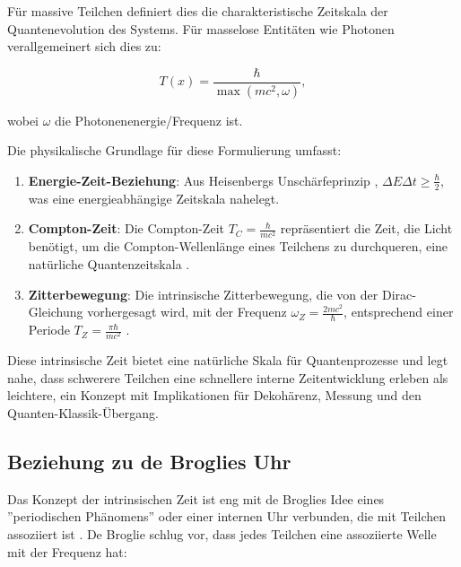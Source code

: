 \documentclass[12pt,a4paper]{article}
\newcommand{\Tfield}{T(x)}
\begin{document}
	Für massive Teilchen definiert dies die charakteristische Zeitskala der Quantenevolution des Systems. Für masselose Entitäten wie Photonen verallgemeinert sich dies zu:
	
	\begin{equation}
		\Tfield = \frac{\hbar}{\max(mc^2, \omega)},
		\label{eq:intrinsic_time_general}
	\end{equation}
	
	wobei $\omega$ die Photonenenergie/Frequenz ist.
	
	Die physikalische Grundlage für diese Formulierung umfasst:
	
	\begin{enumerate}
		\item \textbf{Energie-Zeit-Beziehung}: Aus Heisenbergs Unschärfeprinzip \cite{Heisenberg1927, Mandelstam1945}, $\Delta E \Delta t \geq \frac{\hbar}{2}$, was eine energieabhängige Zeitskala nahelegt.
		
		\item \textbf{Compton-Zeit}: Die Compton-Zeit $T_C = \frac{\hbar}{mc^2}$ repräsentiert die Zeit, die Licht benötigt, um die Compton-Wellenlänge eines Teilchens zu durchqueren, eine natürliche Quantenzeitskala \cite{MacGibbon1987, Caldirola1953}.
		
		\item \textbf{Zitterbewegung}: Die intrinsische Zitterbewegung, die von der Dirac-Gleichung vorhergesagt wird, mit der Frequenz $\omega_Z = \frac{2mc^2}{\hbar}$, entsprechend einer Periode $T_Z = \frac{\pi\hbar}{mc^2}$ \cite{Dirac1928, Schrodinger1930, Hestenes1990}.
	\end{enumerate}
	
	Diese intrinsische Zeit bietet eine natürliche Skala für Quantenprozesse und legt nahe, dass schwerere Teilchen eine schnellere interne Zeitentwicklung erleben als leichtere, ein Konzept mit Implikationen für Dekohärenz, Messung und den Quanten-Klassik-Übergang.
	
	\subsection{Beziehung zu de Broglies Uhr}
	\label{subsec:debroglie_clock}
	
	Das Konzept der intrinsischen Zeit ist eng mit de Broglies Idee eines ''periodischen Phänomens'' oder einer internen Uhr verbunden, die mit Teilchen assoziiert ist \cite{deBroglie1923, deBroglie1924}. De Broglie schlug vor, dass jedes Teilchen eine assoziierte Welle mit der Frequenz hat:
	
\end{document}
